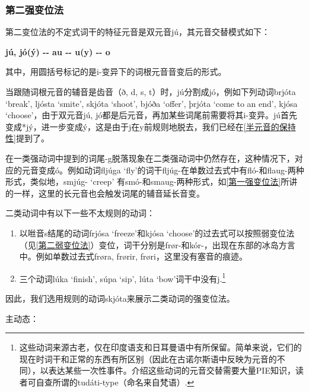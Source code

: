 \subsubsection{第二强变位法}\label{第二强变位法}

第二变位法的不定式词干的特征元音是双元音jú，其元音交替模式如下：

\textbf{jú, jó(ý) -\/- au -\/- u(y) -\/- o}

其中，用圆括号标记的是i-变异下的词根元音音变后的形式。

当跟随词根元音的辅音是齿音（ð, d, s,
t）时，jú分割成jó，例如下列动词brjóta `break‌', ljósta `smite‌', skjóta
`shoot‌', bjóða `offer‌', þrjóta `come to an end‌', kjósa
`choose‌'，由于双元音jú,
jó都是后元音，再加某些词尾前需要将其i-变异。jú首先变成*jý，进一步变成ý，这是由于j在y前规则地脱去，我们已经在\ref{半元音的保持性}提到了。

在一类强动词中提到的词尾-g脱落现象在二类强动词中仍然存在，这种情况下，对应的元音变成ó。例如动词fljúga
`fly‌'的词干fljúg-在单数过去式中有fló-和flaug-两种形式，类似地，smjúg-
`creep‌'
有smó-和smaug-两种形式，如\ref{第一强变位法}所讲的一样，这里的长元音也会触发词尾的辅音延长音变。

二类动词中有以下一些不太规则的动词：

\begin{enumerate}
  \def\labelenumi{\arabic{enumi})}
  \item
        以咝音s结尾的动词frjósa `freeze‌'和kjósa
        `choose‌'的过去式可以按照弱变位法（见\ref{第二弱变位法}）变位，词干分别是frør-和kór-，出现在东部的冰岛方言中。例如单数过去式frøra,
        frørir, frøri，这里没有塞音的痕迹。
  \item
        三个动词lúka `finish‌', súpa `sip‌', lúta `bow‌'词干中没有j.\footnote{这些动词来源古老，仅在印度语支和日耳曼语中有所保留。简单来说，它们的现在时词干和正常的东西有所区别（因此在古诺尔斯语中反映为元音的不同），以表达某些一次性事件。介绍这些动词的元音交替需要大量PIE知识，读者可自查所谓的tudáti-type（命名来自梵语）.}
\end{enumerate}

因此，我们选用规则的动词skjóta来展示二类动词的强变位法。

主动态：

